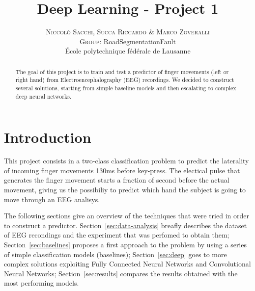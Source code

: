 \documentclass[10pt,conference,compsocconf]{IEEEtran}
\begin{document}
	
\pretitle{\begin{center}\Huge\bfseries} %
\posttitle{\end{center}} %
\title{Deep Learning - Project 1}

\author{
	\textsc{Niccol\`{o} Sacchi, Succa Riccardo \& Marco Zoveralli}
	\normalsize{} \\
	\textsc{Group:}
	\normalsize{RoadSegmentationFault}\\
	\normalsize \'{E}cole polytechnique f\'{e}d\'{e}rale de Lausanne
}

\maketitle

\begin{abstract}
  The goal of this project is to train and test a predictor of finger movements (left or right hand) from Electroencephalography
(EEG) recordings. We decided to construct several solutions, starting from simple baseline models and then escalating to complex deep neural networks. 
\end{abstract}

\section{Introduction}
This project consists in a two-class classification problem to predict the laterality of incoming finger movements 130ms before key-press. The electical pulse that generates the finger movement starts a fraction of second before the actual movement, giving us the possibiliy to predict which hand the subject is going to move through an EEG analisys.


The following sections give an overview of the techniques that were tried in order to construct a predictor. Section~\ref{sec:data-analysis} breafly describes the dataset of EEG recondings and the experiment that was perfomed to obtain them; Section~\ref{sec:baselines} proposes a first approach to the problem by using a series of simple classification models (baselines); Section~\ref{sec:deep} goes to more complex solutions exploiting Fully Connected Neural Networks and Convolutional Neural Networks; Section~\ref{sec:results} compares the results obtained with the most performing models.
\end{document}
